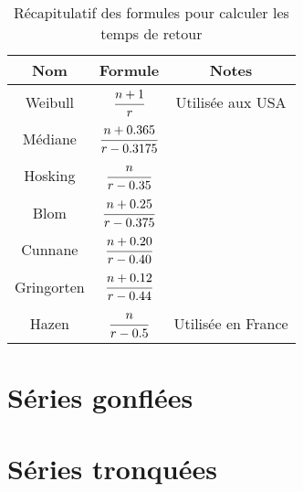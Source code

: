 \begin{table}[h!]
    \centering
    \begin{tabular}{ccc}
        \toprule
        \textbf{Nom} & \textbf{Formule}            & \textbf{Notes}     \\
        \toprule
        Weibull      & $\cfrac{n+1}{r}$            & Utilisée aux USA   \\
        \midrule
        Médiane      & $\cfrac{n+0.365}{r-0.3175}$ &                    \\
        \midrule
        Hosking      & $\cfrac{n}{r-0.35}$         &                    \\
        \midrule
        Blom         & $\cfrac{n+0.25}{r-0.375}$   &                    \\
        \midrule
        Cunnane      & $\cfrac{n+0.20}{r-0.40}$    &                    \\
        \midrule
        Gringorten   & $\cfrac{n+0.12}{r-0.44}$    &                    \\
        \midrule
        Hazen        & $\cfrac{n}{r-0.5}$          & Utilisée en France \\
        \bottomrule
    \end{tabular}
    \caption{Récapitulatif des formules pour calculer les temps de retour}
    \label{tab:formuleTempsRetour}
\end{table}


\section{Séries gonflées}
\section{Séries tronquées}
